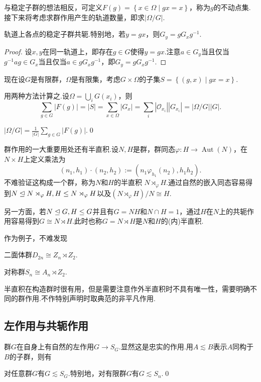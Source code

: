 与稳定子群的想法相反，可定义$F(g)=\left\{x\in\Omega\mid gx=x\right\}$，称为$g$的{\heiti 不动点集}.接下来将考虑求群作用产生的轨道数量，即求$|\Omega/G|$.
\begin{lemma*}
	轨道上各点的稳定子群共轭.特别地，若$y=gx$，则$G_y=gG_xg^{-1}$.
\end{lemma*}
\begin{proof}
	设$x,y$在同一轨道上，即存在$g\in G$使得$y=gx$.注意$a\in G_y$当且仅当$g^{-1}ag\in G_x$当且仅当$a\in gG_xg^{-1}$，即$G_y=gG_xg^{-1}$.
\end{proof}

现在设$G$是有限群，$\Omega$是有限集，考虑$G\times\Omega$的子集$S=\left\{(g,x)\mid gx=x\right\}$.

用两种方法计算之.设$\Omega=\bigcup_i G(x_i)$，则
\[
	\sum_{g\in G}|F(g)|=|S|=\sum_{x\in\Omega}|G_x|=\sum_i|\mathcal{O}_{x_i}||G_{x_i}|=|\Omega/G||G|.
\]
\begin{thm}[(Burnside引理)]
	$\displaystyle|\Omega/G|=\frac{1}{|G|}\sum_{g\in G}|F(g)|$.\qed
\end{thm}

群作用的一大重要用处还有\hypertarget{text:Semidirect}{半直积}.设$N,H$是群，群同态$\varphi\colon H\to\operatorname*{Aut}(N)$，在$N\times H$上定义乘法为
\[
	(n_1,h_1)\cdot(n_2,h_2):=(n_1\varphi_{h_1}(n_2),h_1h_2).
\]
不难验证这构成一个群，称为$N$和$H$的{\heiti 半直积} $N\rtimes_\varphi H$.通过自然的嵌入同态容易得到$N\trianglelefteq N\rtimes_\varphi H,H\le N\rtimes_\varphi H$以及$(N\rtimes_\varphi H)/N\cong H$.

另一方面，若$N\trianglelefteq G,H\le G$并且有$G=NH$和$N\cap H=1$，通过$H$在$N$上的共轭作用容易得到$G\cong N\rtimes H$.此时也称$G=N\rtimes H$是$N$和$H$的{\heiti (内)半直积}.

作为例子，不难发现
\par\begin{itemize*}
	\item 二面体群$D_{2n}\cong Z_n\rtimes Z_2$.\phantom{\qquad}
	\item 对称群$S_n\cong A_n\rtimes Z_2$.
\end{itemize*}\par
\medskip 半直积在构造群时很有用，但是需要注意作外半直积时不具有唯一性，需要明确不同的群作用.不作特别声明时取典范的非平凡作用.

\subsection{左作用与共轭作用}
群$G$在自身上有自然的左作用$G\to S_G$.显然这是忠实的作用.用$A\lesssim B$表示$A$同构于$B$的子群，则有
\begin{thm}[(Cayley)]
	对任意群$G$有$G\lesssim S_G$.特别地，对有限群$G$有$G\lesssim S_n$.\qed\hypertarget{thm:Cayley}{}
\end{thm}

